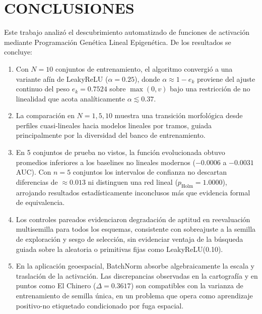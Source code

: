 \documentclass[10pt,twocolumn,letterpaper]{article}
\begin{document}
\section{CONCLUSIONES}

Este trabajo analizó el descubrimiento automatizado de funciones de activación mediante Programación Genética Lineal Epigenética. De los resultados se concluye:

\begin{enumerate}[leftmargin=1.2em]
  \item Con $N=10$ conjuntos de entrenamiento, el algoritmo convergió a una variante afín de LeakyReLU ($\alpha = 0.25$), donde $\alpha \approx 1 - e_k$ proviene del ajuste continuo del peso $e_k = 0.7524$ sobre $\max(0, v)$ bajo una restricción de no linealidad que acota analíticamente $\alpha \lesssim 0.37$.
  \item La comparación en $N=1, 5, 10$ muestra una transición morfológica desde perfiles cuasi-lineales hacia modelos lineales por tramos, guiada principalmente por la diversidad del banco de entrenamiento.
  \item En 5 conjuntos de prueba no vistos, la función evolucionada obtuvo promedios inferiores a los baselines no lineales modernos ($-0.0006$ a $-0.0031$ AUC). Con $n=5$ conjuntos los intervalos de confianza no descartan diferencias de $\approx 0.013$ ni distinguen una red lineal ($p_{\mathrm{Holm}} = 1.0000$), arrojando resultados estadísticamente inconclusos más que evidencia formal de equivalencia.
  \item Los controles pareados evidenciaron degradación de aptitud en reevaluación multisemilla para todos los esquemas, consistente con sobreajuste a la semilla de exploración y sesgo de selección, sin evidenciar ventaja de la búsqueda guiada sobre la aleatoria o primitivas fijas como LeakyReLU(0.10).
  \item En la aplicación geoespacial, BatchNorm absorbe algebraicamente la escala y traslación de la activación. Las discrepancias observadas en la cartografía y en puntos como El Chinero ($\Delta = 0.3617$) son compatibles con la varianza de entrenamiento de semilla única, en un problema que opera como aprendizaje positivo-no etiquetado condicionado por fuga espacial.
\end{enumerate}
\end{document}
